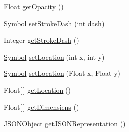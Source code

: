 \begin{DoxyCompactItemize}
Float \hyperlink{classbridges_1_1base_1_1_symbol_a0135a9633599ee1a463f7bd83c425d02}{get\+Opacity} ()
\item 
\hyperlink{classbridges_1_1base_1_1_symbol}{Symbol} \hyperlink{classbridges_1_1base_1_1_symbol_ad36224ec7cb588dbbaa8040ef59ffbfc}{set\+Stroke\+Dash} (int dash)
\item 
Integer \hyperlink{classbridges_1_1base_1_1_symbol_a31ff460ae6b24ed968c1045e2533a967}{get\+Stroke\+Dash} ()
\item 
\hyperlink{classbridges_1_1base_1_1_symbol}{Symbol} \hyperlink{classbridges_1_1base_1_1_symbol_ab378b9b3c5ab203fbb4661697f7f7e0a}{set\+Location} (int x, int y)
\item 
\hyperlink{classbridges_1_1base_1_1_symbol}{Symbol} \hyperlink{classbridges_1_1base_1_1_symbol_a7d02e54c0cdfcaa7cb26176474207e39}{set\+Location} (Float x, Float y)
\item 
Float\mbox{[}$\,$\mbox{]} \hyperlink{classbridges_1_1base_1_1_symbol_a73b96ca5cafe7da7b38aa7e7e57fc1d4}{get\+Location} ()
\item 
Float\mbox{[}$\,$\mbox{]} \hyperlink{classbridges_1_1base_1_1_symbol_a68a8abc4e07c0d63dbda79b65383ee8f}{get\+Dimensions} ()
\item 
J\+S\+O\+N\+Object \hyperlink{classbridges_1_1base_1_1_symbol_aeba4cfa5b39fe03e72a568a8b7452e60}{get\+J\+S\+O\+N\+Representation} ()
\end{DoxyCompactItemize}
